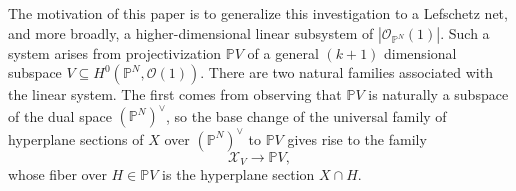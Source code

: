 \documentclass[12pt]{amsart}
\begin{document}



The motivation of this paper is to generalize this investigation to a Lefschetz net, and more broadly, a higher-dimensional linear subsystem of $|\mathcal{O}_{\mathbb P^N}(1)|$. Such a system arises from projectivization $\mathbb PV$ of a general $(k+1)$ dimensional subspace $V\subseteq H^0(\mathbb P^N,\mathcal{O}(1))$. There are two natural families associated with the linear system. The first comes from observing that $\mathbb PV$ is naturally a subspace of the dual space $(\mathbb P^N)^{\vee}$, so the base change of the universal family of hyperplane sections of $X$ over $(\mathbb P^N)^{\vee}$ to $\mathbb PV$  gives rise to the family
\begin{equation}\label{Intro_eqn_univ-family/PV}
    \mathcal{X}_V\to \mathbb PV,
\end{equation}
whose fiber over $H\in \mathbb PV$ is the hyperplane section $X\cap H$.
\end{document}
